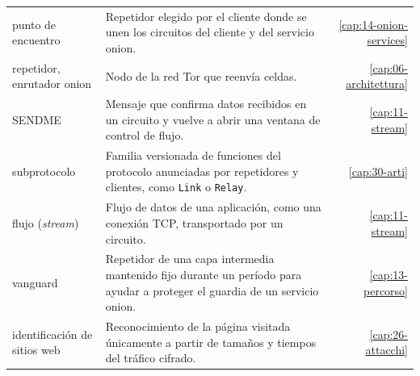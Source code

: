 {\begin{longtable}{@{}>{\raggedright\arraybackslash}p{4.1cm}>{\raggedright\arraybackslash}p{8.0cm}r@{}}
punto de encuentro & Repetidor elegido por el cliente donde se unen los circuitos del cliente y del servicio onion. & \ref{cap:14-onion-services} \\
repetidor, enrutador onion & Nodo de la red Tor que reenvía celdas. & \ref{cap:06-architettura} \\
SENDME & Mensaje que confirma datos recibidos en un circuito y vuelve a abrir una ventana de control de flujo. & \ref{cap:11-stream} \\
subprotocolo & Familia versionada de funciones del protocolo anunciadas por repetidores y clientes, como \texttt{Link} o \texttt{Relay}. & \ref{cap:30-arti} \\
flujo (\emph{stream}) & Flujo de datos de una aplicación, como una conexión TCP, transportado por un circuito. & \ref{cap:11-stream} \\
vanguard & Repetidor de una capa intermedia mantenido fijo durante un período para ayudar a proteger el guardia de un servicio onion. & \ref{cap:13-percorso} \\
identificación de sitios web & Reconocimiento de la página visitada únicamente a partir de tamaños y tiempos del tráfico cifrado. & \ref{cap:26-attacchi} \\
\end{longtable}
}
